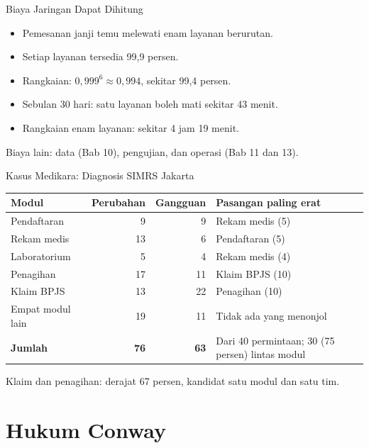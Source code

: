 \documentclass[aspectratio=169, table, 12pt]{beamer}
\begin{document}
\begin{frame}{{\Large Biaya Jaringan Dapat Dihitung}}
  \vspace{10pt}
  \begin{itemize}
    \item Pemesanan janji temu melewati enam layanan berurutan.
    \item Setiap layanan tersedia 99,9 persen.
    \item Rangkaian: $0{,}999^{6} \approx 0{,}994$, sekitar 99,4 persen.
    \item Sebulan 30 hari: satu layanan boleh mati sekitar 43 menit.
    \item Rangkaian enam layanan: sekitar 4 jam 19 menit.
  \end{itemize}
  \vspace{6pt}
  {\small Biaya lain: data (Bab 10), pengujian, dan operasi (Bab 11 dan 13).}
\end{frame}

\begin{frame}{{\Large Kasus Medikara: Diagnosis SIMRS Jakarta}}
  \footnotesize
  \begin{tabularx}{\textwidth}{>{\raggedright\arraybackslash}p{2.4cm} r r
      >{\raggedright\arraybackslash}X}
    \hline
    \textbf{Modul} & \textbf{Perubahan} & \textbf{Gangguan} & \textbf{Pasangan paling erat} \\
    \hline
    Pendaftaran & 9 & 9 & Rekam medis (5) \\
    \hline
    Rekam medis & 13 & 6 & Pendaftaran (5) \\
    \hline
    Laboratorium & 5 & 4 & Rekam medis (4) \\
    \hline
    Penagihan & 17 & 11 & Klaim BPJS (10) \\
    \hline
    Klaim BPJS & 13 & 22 & Penagihan (10) \\
    \hline
    Empat modul lain & 19 & 11 & Tidak ada yang menonjol \\
    \hline
    \textbf{Jumlah} & \textbf{76} & \textbf{63} & Dari 40 permintaan; 30 (75 persen) lintas
      modul \\
    \hline
  \end{tabularx}

  \vspace{6pt}
  \small Klaim dan penagihan: derajat 67 persen, kandidat satu modul dan satu tim.
\end{frame}

\section{Hukum Conway}
\end{document}
